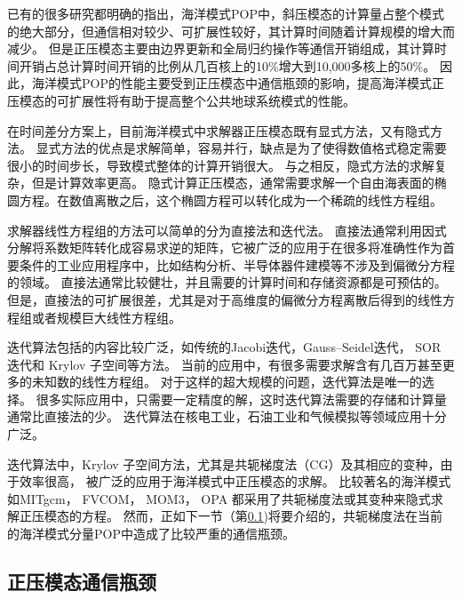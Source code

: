 已有的很多研究都明确的指出，海洋模式POP中，斜压模态的计算量占整个模式的绝大部分，但通信相对较少、可扩展性较好，其计算时间随着计算规模的增大而减少。
但是正压模态主要由边界更新和全局归约操作等通信开销组成，其计算时间开销占总计算时间开销的比例从几百核上的10\%增大到10,000多核上的50\%\cite{pop05,stone2011cgpop,Worley:2011:PCE:2063384.2063457, dennis2012computational}。
因此，海洋模式POP的性能主要受到正压模态中通信瓶颈的影响，提高海洋模式正压模态的可扩展性将有助于提高整个公共地球系统模式的性能。

在时间差分方案上，目前海洋模式中求解器正压模态既有显式方法，又有隐式方法\cite{griffies2000developments}。 
显式方法的优点是求解简单，容易并行，缺点是为了使得数值格式稳定需要很小的时间步长，导致模式整体的计算开销很大。
与之相反，隐式方法的求解复杂，但是计算效率更高。 
隐式计算正压模态，通常需要求解一个自由海表面的椭圆方程。在数值离散之后，这个椭圆方程可以转化成为一个稀疏的线性方程组。

 
求解器线性方程组的方法可以简单的分为直接法和迭代法。
直接法通常利用因式分解将系数矩阵转化成容易求逆的矩阵，它被广泛的应用于在很多将准确性作为首要条件的工业应用程序中，比如结构分析、半导体器件建模等不涉及到偏微分方程的领域\cite{benzi2002preconditioning}。
直接法通常比较健壮，并且需要的计算时间和存储资源都是可预估的。
但是，直接法的可扩展很差，尤其是对于高维度的偏微分方程离散后得到的线性方程组或者规模巨大线性方程组。 

迭代算法包括的内容比较广泛，如传统的Jacobi迭代，Gauss–Seidel迭代， SOR 迭代和 Krylov 子空间等方法\cite{saad2003iterative,barrett1994templates}。
当前的应用中，有很多需要求解含有几百万甚至更多的未知数的线性方程组。 对于这样的超大规模的问题，迭代算法是唯一的选择。
很多实际应用中，只需要一定精度的解，这时迭代算法需要的存储和计算量通常比直接法的少。 
迭代算法在核电工业，石油工业和气候模拟等领域应用十分广泛。

迭代算法中，Krylov 子空间方法，尤其是共轭梯度法（CG）及其相应的变种，由于效率很高，
被广泛的应用于海洋模式中正压模态的求解。
比较著名的海洋模式如MITgcm\citep{adcroft2014mitgcm}， FVCOM\citep{lai2010nonhydrostatic}， MOM3\citep{pacanowsky1999mom3}， OPA \citep{madec1997ocean}
都采用了共轭梯度法或其变种来隐式求解正压模态的方程。
然而，正如下一节（第\ref{related:bottleneck})将要介绍的，共轭梯度法在当前的海洋模式分量POP中造成了比较严重的通信瓶颈\citep{Worley:2011:PCE:2063384.2063457}。 

 

\subsection{正压模态通信瓶颈}
\label{related:bottleneck}

